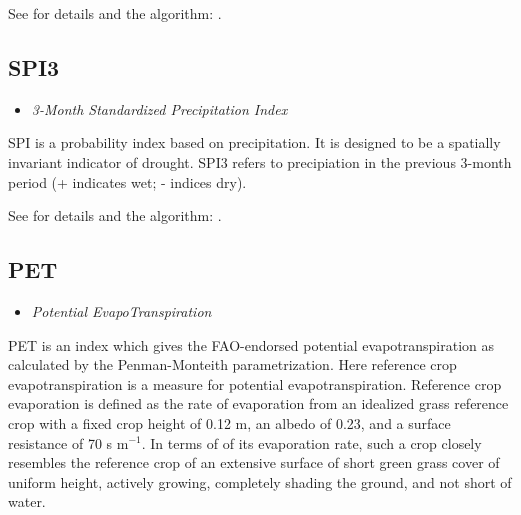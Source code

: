 \documentclass[a4paper,11pt]{article}
\begin{document}
See for details and the algorithm: \citet{guttman:99}.

\subsection*{SPI3}
\begin{itemize}
\item \textit{3-Month Standardized Precipitation Index}
\end{itemize}
SPI is a probability index based on precipitation. It is designed to
be a spatially invariant indicator of drought. SPI3 refers to
precipiation in the previous 3-month period (+ indicates wet; -
indices dry).

See for details and the algorithm: \citet{guttman:99}.

\subsection*{PET}
\begin{itemize}
\item \textit{Potential EvapoTranspiration}
\end{itemize}
PET is an index which gives the FAO-endorsed potential evapotranspiration
as calculated by the Penman-Monteith parametrization. 
Here reference crop evapotranspiration is a measure for potential evapotranspiration.
Reference crop evaporation is defined as the rate of evaporation from an
idealized grass reference crop with a fixed crop height of 0.12 m, an albedo of 0.23, and
a surface resistance of 70 s m$^{-1}$. In terms of of its evaporation rate, such a crop closely resembles
the reference crop of an extensive surface of short green grass cover of uniform height,
actively growing, completely shading the ground, and not short of water.
\end{document}
